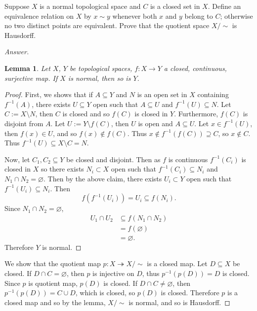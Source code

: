 \documentclass[12pt]{article}
\newcommand\inv[1]{#1^{-1}}
\newcommand\paren[1]{\left( #1 \right)}
\newtheorem{lemma}[theorem]{Lemma}
\theoremstyle{definition}
\begin{document}
Suppose $X$ is a normal topological space and $C$ is a closed set in $X$. Define an equivalence relation on $X$ by $x \sim y$ whenever both $x$ and $y$ belong to $C$; otherwise no two distinct points are equivalent. Prove that the quotient space $X / \sim$ is Hausdorff.
\begin{proof}[Answer]
    \begin{lemma}
        Let $X$, $Y$ be topological spaces, $f : X \to Y$ a closed, continuous, surjective map. If $X$ is normal, then so is $Y$.
    \end{lemma}
    \begin{proof}
        First, we shows that if $A \subseteq Y$ and $N$ is an open set in $X$ containing $\inv{f}(A)$, there exists $U \subseteq Y$ open such that $A \subseteq U$ and $\inv{f}(U) \subseteq N$. Let $C := X \setminus N$, then $C$ is closed and so $f(C)$ is closed in $Y$. Furthermore, $f(C)$ is disjoint from $A$. Let $U := Y \setminus f(C)$, then $U$ is open and $A \subseteq U$. Let $x \in \inv{f}(U)$, then $f(x) \in U$, and so $f(x) \notin f(C)$. Thus $x \notin \inv{f}( f(C) ) \supseteq C$, so $x \notin C$. Thus $\inv{f}(U) \subseteq X \setminus C = N$.
        
        Now, let $C_1 , C_2 \subseteq Y$ be closed and disjoint. Then as $f$ is continuous $\inv{f} \paren{ C_i }$ is closed in $X$ so there exists $N_i \subset X$ open such that $\inv{f} \paren{ C_i } \subseteq N_i$ and $N_1 \cap N_2 = \varnothing$. Then by the above claim, there exists $U_i \subset Y$ open such that $\inv{f} \paren{ U_i } \subseteq N_i$. Then 
        \[
            f \paren{ \inv{f} \paren{ U_i } } = U_i \subseteq f \paren{ N_i }.
        \]
        Since $N_1 \cap N_2 = \varnothing$,
        \begin{align*}
            U_1 \cap U_2 & \subseteq f \paren{ N_1 \cap N_2 } \\
        & = f \paren{ \varnothing } \\
            & = \varnothing.
        \end{align*}
    Therefore $Y$ is normal.
    \end{proof}
    We show that the quotient map $p : X \twoheadrightarrow X/\sim$ is a closed map. Let $D \subseteq X$ be closed. If $D \cap C = \varnothing$, then $p$ is injective on $D$, thus $\inv{p}(p(D)) = D$ is closed. Since $p$ is quotient map, $p(D)$ is closed. If $D \cap C \neq \varnothing$, then $\inv{p}(p(D)) = C \cup D$, which is closed, so $p(D)$ is closed. Therefore $p$ is a closed map and so by the lemma, $X / \sim$ is normal, and so is Hausdorff.
\end{proof}
\end{document}
